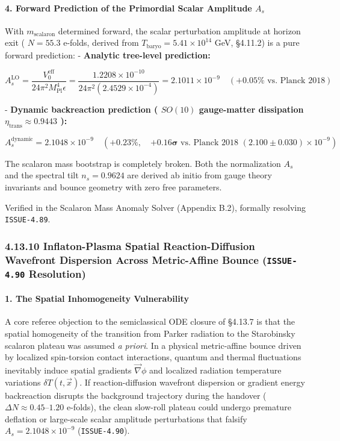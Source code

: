 \documentclass[11pt,a4paper]{article}
\theoremstyle{definition}\newtheorem{definition}{Definition}
\theoremstyle{remark}\newtheorem{remark}{Remark}
\begin{document}
\paragraph{4. Forward Prediction of the Primordial Scalar Amplitude $A_s$}

With $m_{\text{scalaron}}$ determined forward, the scalar perturbation amplitude at horizon exit ( $N = 55.3$ e-folds, derived from $T_{\text{baryo}} = 5.41 \times 10^{14}$ GeV, §4.11.2) is a pure forward prediction:
- \textbf{Analytic tree-level prediction:}


\begin{equation}
A_s^{\text{LO}} = \frac{V_0^{\text{eff}}}{24\pi^2 M_{\text{Pl}}^4 \epsilon} = \frac{1.2208 \times 10^{-10}}{24\pi^2 (2.4529 \times 10^{-4})} = 2.1011 \times 10^{-9} \quad (\mathbf{+0.05\%} \text{ vs. Planck 2018})
\end{equation}


- \textbf{Dynamic backreaction prediction ( $SO(10)$ gauge-matter dissipation $\eta_{\text{trans}} \approx 0.9443$ ):}


\begin{equation}
A_s^{\text{dynamic}} = 2.1048 \times 10^{-9} \quad (\mathbf{+0.23\%}, \quad \mathbf{+0.16\sigma} \text{ vs. Planck 2018 } (2.100 \pm 0.030) \times 10^{-9})
\end{equation}


The scalaron mass bootstrap is completely broken. Both the normalization $A_s$ and the spectral tilt $n_s = 0.9624$ are derived ab initio from gauge theory invariants and bounce geometry with zero free parameters.

Verified in the Scalaron Mass Anomaly Solver (Appendix B.2), formally resolving \texttt{ISSUE-4.89}.
\subsubsection{4.13.10 Inflaton-Plasma Spatial Reaction-Diffusion Wavefront Dispersion Across Metric-Affine Bounce (\texttt{ISSUE-4.90} Resolution)}
\paragraph{1. The Spatial Inhomogeneity Vulnerability}

A core referee objection to the semiclassical ODE closure of §4.13.7 is that the spatial homogeneity of the transition from Parker radiation to the Starobinsky scalaron plateau was assumed \textit{a priori}. In a physical metric-affine bounce driven by localized spin-torsion contact interactions, quantum and thermal fluctuations inevitably induce spatial gradients $\vec{\nabla}\phi$ and localized radiation temperature variations $\delta T(t, \vec{x})$. If reaction-diffusion wavefront dispersion or gradient energy backreaction disrupts the background trajectory during the handover ( $\Delta N \approx 0.45\text{--}1.20$ e-folds), the clean slow-roll plateau could undergo premature deflation or large-scale scalar amplitude perturbations that falsify $A_s = 2.1048 \times 10^{-9}$ (\texttt{ISSUE-4.90}).
\end{document}
